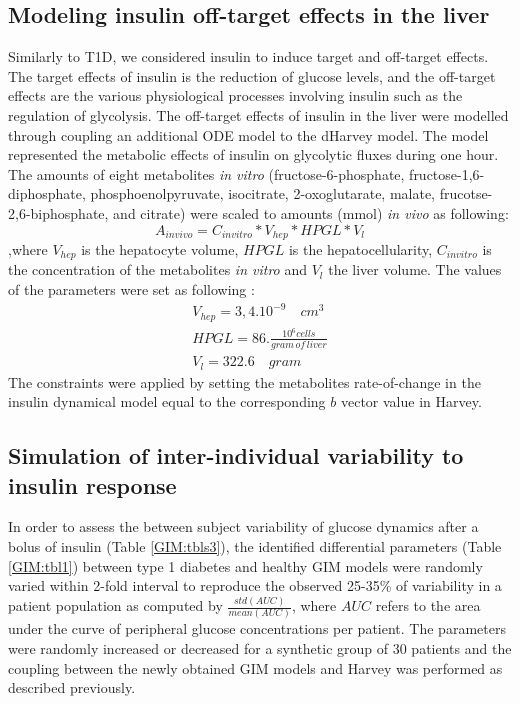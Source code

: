 \subsection{Modeling insulin off-target effects in the liver}
Similarly to T1D, we considered insulin to induce target and off-target effects. The target effects of insulin is the reduction of glucose levels, and the off-target effects are the various physiological processes involving insulin such as the regulation of glycolysis. The off-target effects of insulin in the liver were modelled through coupling an additional ODE model to the dHarvey model. The model \cite{yugi2014reconstruction} represented the metabolic effects of insulin on glycolytic fluxes during one hour. The amounts of eight metabolites \textit{in vitro} (fructose-6-phosphate, fructose-1,6-diphosphate, phosphoenolpyruvate, isocitrate, 2-oxoglutarate, malate, frucotse-2,6-biphosphate, and citrate) were scaled to amounts (mmol) \textit{in vivo} as following: 
\begin{equation*}
A_{invivo}=C_{invitro}*V_{hep}*HPGL*V_l
\end{equation*} 
,where $V_{hep}$ is the hepatocyte volume, $HPGL$ is the hepatocellularity, $C_{invitro}$ is the concentration of the metabolites \textit{in vitro} and $V_l$ the liver volume.
The values of the parameters were set as following \cite{heinemann1999standard}:
\begin{gather*}
V_{hep}=3,4.10^{-9} \quad cm^3 \\
HPGL=86.\frac{10^6 cells}{gram \, of \, liver}\\
V_l=322.6 \quad gram
\end{gather*}
The constraints were applied by setting the metabolites rate-of-change in the insulin dynamical model equal to the corresponding $b$ vector value in Harvey.
\subsection{Simulation of inter-individual variability to insulin response}
In order to assess the between subject variability of glucose dynamics after a bolus of insulin (Table \ref{GIM:tbls3}), the identified differential parameters \cite{schaller2013generic} (Table \ref{GIM:tbl1}) between type 1 diabetes and healthy GIM models were randomly varied within 2-fold interval to reproduce the observed 25-35\% of variability in a patient population \cite{heinemann2002variability} as computed by $\frac{std(AUC)}{mean(AUC)}$, where $AUC$ refers to the area under the curve of peripheral glucose concentrations per patient. The parameters were randomly increased or decreased for a synthetic group of 30 patients and the coupling between the newly obtained GIM models and Harvey was performed as described previously.  
